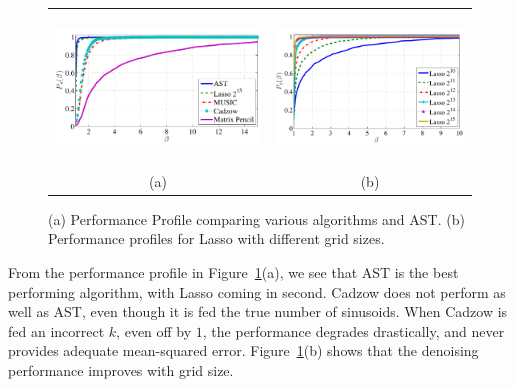 \begin{figure}[htp]
\centering
\begin{tabular}{cc}
	\includegraphics[height=40mm]{figures/performance_profile_randamp_color} &
	\includegraphics[trim=0mm 0mm 2mm 5mm,clip,height=40mm]{figures/performance_profile_lasso_randamp_color}\\
(a) & (b)
\end{tabular}
\caption{ (a) Performance Profile  comparing various algorithms and AST. (b) Performance profiles for Lasso with different grid sizes.}
\label{fig:pp1}
\end{figure}


From the performance profile in Figure~\ref{fig:pp1}(a), we see that AST is the
best performing algorithm, with Lasso coming in
second. Cadzow does not perform as well as AST, even though it is fed the true
number of sinusoids. When Cadzow is fed an incorrect $k$, even off by $1$, the
performance degrades drastically, and never provides adequate mean-squared
error. Figure~\ref{fig:pp1}(b) shows that the denoising performance
improves  with grid size.

